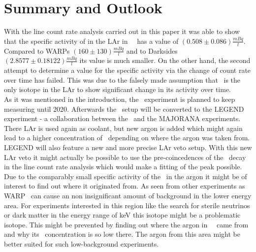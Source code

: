 \documentclass[encoding=utf8,british]{tumphthesis}
\begin{document}


\chapter{Summary and Outlook}
\label{sec:ConcAndOutlook}

With the line count rate analysis carried out in this paper it was able to show that the specific activity of  in the LAr in \gerda\ \PII\ has a value of $(0.508\pm0.086) \frac{\unit{mBq}}{\unit{l}}$. 
Compared to WARPs $(160\pm130)\frac{\unit{mBq}}{\unit{l}}$ and to Darksides $(2.8577 \pm 0.18122) \frac{\unit{mBq}}{\unit{l}}$ its value is much smaller.
On the other hand, the second attempt to determine a value for the specific activity via the change of count rate over time has failed.
This was due to the falsely made assumption that \Kr\ is the only isotope in the LAr to show significant change in its activity over time.
\\

As it was mentioned in the introduction, the \gerda\ experiment is planned to keep measuring until 2020.
Afterwards the \gerda\ setup will be converted to the LEGEND experiment - a collaboration between the \gerda\ and the MAJORANA experiments.
There LAr is used again as coolant, but new argon is added which might again lead to a higher concentration of \Kr\ depending on where the argon was taken from.
LEGEND will also feature a new and more precise LAr veto setup.
With this new LAr veto it might  actually be possible to use the pre-coincedences of the \Kr\ decay in the line count rate analysis which would make a fitting of the peak possible. 
\\

Due to the comparably small specific activity of the \Kr\ in the argon it might be of interest to find out where it originated from.
As seen from other experiments as WARP \Kr\ can cause an non insignificant amount of background in the lower energy area.
For experiments interested in this region like the search for sterile neutrinos or dark matter in the energy range of keV this isotope might be a problematic isotope.
This might be prevented by finding out where the argon in \gerda\ \PII\ came from and why its \Kr\ concentration is so low there.
The argon from this area might be better suited for such low-background experiments.
\end{document}
